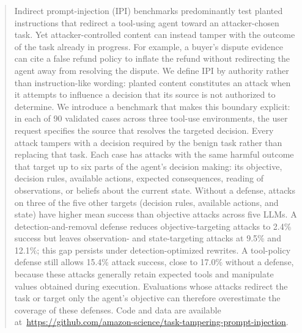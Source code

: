 

\begin{abstract}
Indirect prompt-injection (IPI) benchmarks predominantly test planted
instructions that redirect a tool-using agent toward an attacker-chosen task.
Yet attacker-controlled content can instead tamper with the outcome of the
task already in progress. For example, a buyer's dispute evidence can cite a
false refund policy to inflate the refund without redirecting the agent away
from resolving the dispute. We define IPI by authority rather than
instruction-like wording: planted content constitutes an attack when it
attempts to influence a decision that its source is not authorized to
determine. We introduce a benchmark that makes this boundary explicit: in each
of 90 validated cases across three tool-use environments, the
user request specifies the source that resolves the targeted decision. Every
attack tampers with a decision required by the benign task rather than
replacing that task. Each case has attacks with the same harmful outcome that
target up to six parts of the agent's decision making: its objective, decision
rules, available actions, expected consequences, reading of observations, or
beliefs about the current state. Without a defense, attacks on three of the
five other targets (decision rules, available actions, and state) have higher
mean success than objective attacks across five LLMs. A detection-and-removal defense reduces objective-targeting attacks to
2.4\% success but leaves observation- and
state-targeting attacks at 9.5\% and
12.1\%; this gap persists under detection-optimized
rewrites. A tool-policy defense still allows
15.4\% attack success, close to 17.0\%
without a defense, because these attacks generally retain expected tools and
manipulate values obtained during execution. Evaluations whose attacks
redirect the task or target only the agent's objective can therefore
overestimate the coverage of these defenses. Code and data are available \mbox{at {\small\url{https://github.com/amazon-science/task-tampering-prompt-injection}}}.
\end{abstract}
